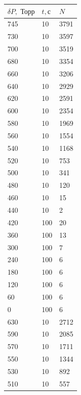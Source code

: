 \documentclass[a4paper,12pt]{article} %
\begin{document}
\newpage

\begin{table}[h!]
\begin{tabular}{|l|l|l|}
\hline
$\delta P, \text{ Торр}$ & $t, \text{с}$ & $N$  \\ \hline
745                      & 10            & 3791 \\ \hline
730                      & 10            & 3597 \\ \hline
700                      & 10            & 3519 \\ \hline
680                      & 10            & 3354 \\ \hline
660                      & 10            & 3206 \\ \hline
640                      & 10            & 2929 \\ \hline
620                      & 10            & 2591 \\ \hline
600                      & 10            & 2354 \\ \hline
580                      & 10            & 1969 \\ \hline
560                      & 10            & 1554 \\ \hline
540                      & 10            & 1168 \\ \hline
520                      & 10            & 753  \\ \hline
500                      & 10            & 341  \\ \hline
480                      & 10            & 120  \\ \hline
460                      & 10            & 15   \\ \hline
440                      & 10            & 2    \\ \hline
420                      & 100           & 20   \\ \hline
360                      & 100           & 13   \\ \hline
300                      & 100           & 7    \\ \hline
240                      & 100           & 6    \\ \hline
180                      & 100           & 6    \\ \hline
120                      & 100           & 6    \\ \hline
60                       & 100           & 6    \\ \hline
0                        & 100           & 6    \\ \hline
630                      & 10            & 2712 \\ \hline
590                      & 10            & 2085 \\ \hline
570                      & 10            & 1711 \\ \hline
550                      & 10            & 1344 \\ \hline
530                      & 10            & 892  \\ \hline
510                      & 10            & 557  \\ \hline
\end{tabular}
\end{table}
\end{document}
